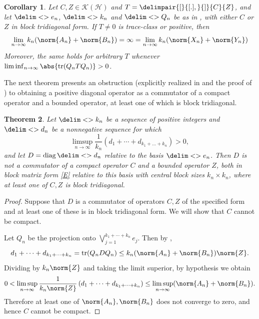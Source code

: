 \documentclass[10pt,reqno]{amsart}
\newtheorem{theorem}{Theorem}[section]
\newtheorem{corollary}[theorem]{Corollary}
\theoremstyle{remark}
\newcommand{\KH}{\mathcal{K}(\Hil)}
\newcommand{\Hil}{\mathcal{H}}
\DeclareMathOperator{\diag}{diag}
\DeclareMathOperator{\trace}{tr}
\newcommand{\seq}{\delim<>}
\newcommand{\comm}{\delimpair{[}{[.],}{]}}
\numberwithin{equation}{section}
\begin{document}
\begin{corollary}
  \label{cor:CZ-compact-norm-size-constraint}
  Let $C,Z \in \KH$ and $T = \comm{C}{Z}$, and let $\seq{e_n}$, $\seq{k_n}$ and $\seq{Q_n}$ be as in , with either $C$ or $Z$ in block tridiagonal form.
  If $T \neq 0$ is trace-class or positive, then
  \begin{equation*}
    \lim_{n \to \infty} k_n(\norm{A_n} + \norm{B_n}) = \infty = \lim_{n \to \infty} k_n(\norm{X_n} + \norm{Y_n})
  \end{equation*}
  Moreover, the same holds for arbitrary $T$ whenever $\liminf_{n \to \infty} \abs{\trace(Q_n T Q_n)} > 0$.
\end{corollary}

The next theorem presents an obstruction (explicitly realized in  and the proof of ) to obtaining a positive diagonal operator as a commutator of a compact operator and a bounded operator, at least one of which is block tridiagonal.

\begin{theorem}
  \label{thm:k_n-average-diagonal-obstruction}
  Let $\seq{k_n}$ be a sequence of positive integers and $\seq{d_n}$ be a nonnegative sequence for which
  \begin{equation}
    \label{eq34}
    \limsup_{n \to \infty} \frac{1}{k_n}\left(d_1 +  \cdots + d_{k_1+\dots+k_n}\right) > 0,
  \end{equation}
  and let $D = \diag\seq{d_n}$ relative to the basis $\seq{e_n}$.
  Then $D$ is not a commutator of a compact operator $C$ and a bounded operator $Z$, both in block matrix form \eqref{E} relative to this basis with central block sizes $k_n \times k_n$, where at least one of $C,Z$ is block tridiagonal.
\end{theorem}

\begin{proof}
  Suppose that $D$ is a commutator of operators $C,Z$ of the specified form and at least one of these is in block tridiagonal form.
  We will show that $C$ cannot be compact.
  
  Let $Q_n$ be the projection onto $\bigvee_{j=1}^{k_1 + \cdots + k_n} e_j$.
  Then by ,
  \begin{equation*}
    d_1 + \cdots + d_{k_1 + \cdots + k_n} = \trace(Q_n D Q_n) \le k_n (\norm{A_n} + \norm{B_n}) \norm{Z}.
  \end{equation*}
  Dividing by $k_n \norm{Z}$ and taking the limit superior, by hypothesis we obtain
  \begin{equation*}
    0 < \limsup_{n \to \infty} \frac{1}{k_n \norm{Z}}\left(d_1 +  \cdots + d_{k_1+\dots+k_n}\right) \le \limsup_{n \to \infty} (\norm{A_n} + \norm{B_n}). 
  \end{equation*}
  Therefore at least one of $\norm{A_n},\norm{B_n}$ does not converge to zero, and hence $C$ cannot be compact.
\end{proof}
\end{document}
